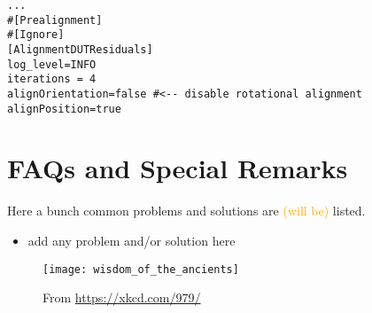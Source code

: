\begin{verbatim}
...
#[Prealignment]
#[Ignore]
[AlignmentDUTResiduals]
log_level=INFO
iterations = 4
alignOrientation=false #<-- disable rotational alignment
alignPosition=true
\end{verbatim}

\section{FAQs and Special Remarks}
Here a bunch common problems and solutions are \textcolor{orange}{(will be)} listed.
\begin{itemize}
\item add any problem and/or solution here
\end{itemize}

\vspace{3cm}
\begin{figure}[h]
	\centering
	\texttt{[image: wisdom\_of\_the\_ancients]}
	\caption{From \url{https://xkcd.com/979/}}
	\label{fig:wisdom}
\end{figure}